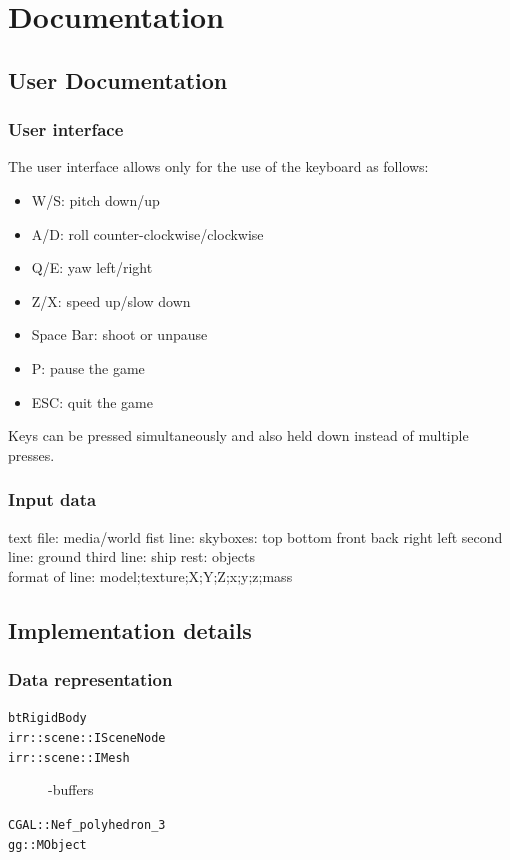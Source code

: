 \chapter*{Documentation}
\section*{User Documentation}

\subsection*{User interface}
The user interface allows only for the use of the keyboard as follows:
\begin{itemize}
\item W/S: pitch down/up
\item A/D: roll counter-clockwise/clockwise 
\item Q/E: yaw left/right
\item Z/X: speed up/slow down
\item Space Bar: shoot or unpause
\item P: pause the game
\item ESC: quit the game
\end{itemize}
Keys can be pressed simultaneously and also held down instead of multiple presses.

\subsection*{Input data}
\label{sec:data}

text file: media/world
fist line: skyboxes: top bottom front back right left
second line: ground
third line: ship
rest: objects\\
format of line: model;texture;X;Y;Z;x;y;z;mass



\section*{Implementation details}

\subsection*{Data representation}
\begin{description}
\item [{\tt btRigidBody}]
\item [{\tt irr::scene::ISceneNode}]
\item [{\tt irr::scene::IMesh}] -buffers
\item [{\tt CGAL::Nef\_polyhedron\_3}]
\item [{\tt gg::MObject}]
\end{description}


